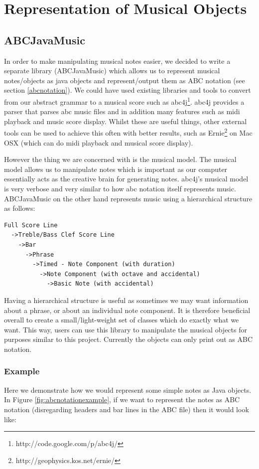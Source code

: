 \documentclass[pdftex,12pt,a4paper]{report}
\begin{document}
\section{Representation of Musical Objects}

\subsection{ABCJavaMusic}
In order to make manipulating musical notes easier, we decided to write a separate library (ABCJavaMusic) which allows us to represent musical notes/objects as java objects and represent/output them as ABC notation (see section \ref{abcnotation}). We could have used existing libraries and tools to convert from our abstract grammar to a musical score such as abc4j\footnote{http://code.google.com/p/abc4j/}. abc4j provides a parser that parses abc music files and in addition many features such as midi playback and music score display. Whilst these are useful things, other external tools can be used to achieve this often with better results, such as Ernie\footnote{http://geophysics.kos.net/ernie/} on Mac OSX (which can do midi playback and musical score display).

However the thing we are concerned with is the musical model. The musical model allows us to manipulate notes which is important as our computer essentially acts as the creative brain for generating notes. abc4j's musical model is very verbose and very similar to how abc notation itself represents music. 
ABCJavaMusic on the other hand represents music using a hierarchical structure as follows:

\begin{verbatim}
Full Score Line
  ->Treble/Bass Clef Score Line
    ->Bar
      ->Phrase
        ->Timed - Note Component (with duration)
          ->Note Component (with octave and accidental)
            ->Basic Note (with accidental)
\end{verbatim}

Having a hierarchical structure is useful as sometimes we may want information about a phrase, or about an individual note component. It is therefore beneficial overall to create a small/light-weight set of classes which do exactly what we want. This way, users can use this library to manipulate the musical objects for purposes similar to this project. Currently the objects can only print out as ABC notation.

\subsubsection{Example}
Here we demonstrate how we would represent some simple notes as Java objects. In Figure \ref{fig:abcnotationexample}, if we want to represent the notes as ABC notation (disregarding headers and bar lines in the ABC file) then it would look like:
\end{document}
